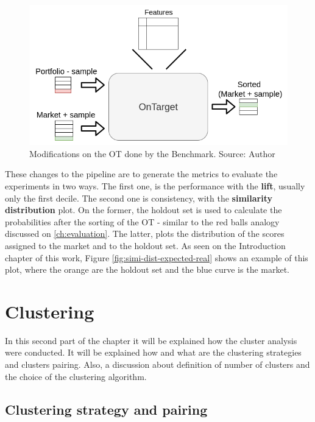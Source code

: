 \begin{figure}[h]
   \centering
   \includegraphics[width=\linewidth]{fig/ch3-ot-benchmark-blocks.png}
   \caption{Modifications on the OT done by the Benchmark. Source: Author}
   \label{fig:ot-benchmark-blocks}
\end{figure}

These changes to the pipeline are to generate the metrics to evaluate the experiments in two ways. The first one, is the performance with the \textbf{lift}, usually only the first decile. The second one is consistency, with the \textbf{similarity distribution} plot. On the former, the holdout set is used to calculate the probabilities after the sorting of the OT - similar to the red balls analogy discussed on \ref{ch:evaluation}. The latter, plots the distribution of the scores assigned to the market and to the holdout set. As seen on the Introduction chapter of this work, Figure \ref{fig:simi-dist-expected-real} shows an example of this plot, where the orange are the holdout set and the blue curve is the market.

\section{Clustering}

In this second part of the chapter it will be explained how the cluster analysis were conducted. It will be explained how and what are the clustering strategies and clusters pairing. Also, a discussion about definition of number of clusters and the choice of the clustering algorithm.

\subsection{Clustering strategy and pairing}

